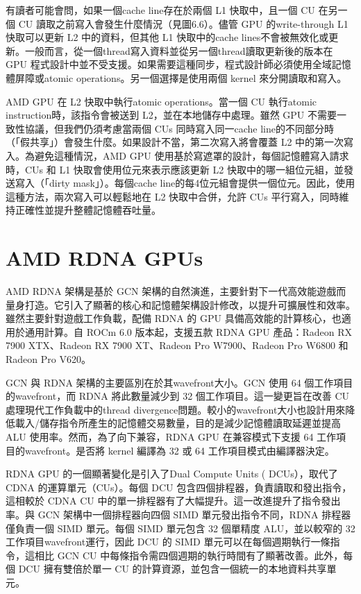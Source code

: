 \vspace{1em}
有讀者可能會問，如果一個cache line存在於兩個 L1 快取中，且一個 CU 在另一個 CU 讀取之前寫入會發生什麼情況（見圖6.6）。儘管 GPU 的write-through L1 快取可以更新 L2 中的資料，但其他 L1 快取中的cache lines不會被無效化或更新。一般而言，從一個thread寫入資料並從另一個thread讀取更新後的版本在 GPU 程式設計中並不受支援。如果需要這種同步，程式設計師必須使用全域記憶體屏障或atomic operations。另一個選擇是使用兩個 kernel 來分開讀取和寫入。

\vspace{1em}
AMD GPU 在 L2 快取中執行atomic operations。當一個 CU 執行atomic instruction時，該指令會被送到 L2，並在本地儲存中處理。雖然 GPU 不需要一致性協議，但我們仍須考慮當兩個 CUs 同時寫入同一cache line的不同部分時（「假共享」）會發生什麼。如果設計不當，第二次寫入將會覆蓋 L2 中的第一次寫入。為避免這種情況，AMD GPU 使用基於寫遮罩的設計，每個記憶體寫入請求時，CUs 和 L1 快取會使用位元來表示應該更新 L2 快取中的哪一組位元組，並發送寫入（「dirty mask」）。每個cache line的每4位元組會提供一個位元。因此，使用這種方法，兩次寫入可以輕鬆地在 L2 快取中合併，允許 CUs 平行寫入，同時維持正確性並提升整體記憶體吞吐量。

\section{AMD RDNA GPUs}

\vspace{1em}
AMD RDNA 架構是基於 GCN 架構的自然演進，主要針對下一代高效能遊戲而量身打造。它引入了顯著的核心和記憶體架構設計修改，以提升可擴展性和效率。雖然主要針對遊戲工作負載，配備 RDNA 的 GPU 具備高效能的計算核心，也適用於通用計算。自 ROCm 6.0 版本起，支援五款 RDNA GPU 產品：Radeon RX 7900 XTX、Radeon RX 7900 XT、Radeon Pro W7900、Radeon Pro W6800 和 Radeon Pro V620。

\vspace{1em}
GCN 與 RDNA 架構的主要區別在於其wavefront大小。GCN 使用 64 個工作項目的wavefront，而 RDNA 將此數量減少到 32 個工作項目。這一變更旨在改善 CU 處理現代工作負載中的thread divergence問題。較小的wavefront大小也設計用來降低載入/儲存指令所產生的記憶體交易數量，目的是減少記憶體讀取延遲並提高 ALU 使用率。然而，為了向下兼容，RDNA GPU 在兼容模式下支援 64 工作項目的wavefront。是否將 kernel 編譯為 32 或 64 工作項目模式由編譯器決定。

\vspace{1em}
RDNA GPU 的一個顯著變化是引入了Dual Compute Units ( DCUs），取代了 CDNA 的運算單元（CUs）。每個 DCU 包含四個排程器，負責讀取和發出指令，這相較於 CDNA CU 中的單一排程器有了大幅提升。這一改進提升了指令發出率。與 GCN 架構中一個排程器向四個 SIMD 單元發出指令不同，RDNA 排程器僅負責一個 SIMD 單元。每個 SIMD 單元包含 32 個單精度 ALU，並以較窄的 32 工作項目wavefront運行，因此 DCU 的 SIMD 單元可以在每個週期執行一條指令，這相比 GCN CU 中每條指令需四個週期的執行時間有了顯著改善。此外，每個 DCU 擁有雙倍於單一 CU 的計算資源，並包含一個統一的本地資料共享單元。

